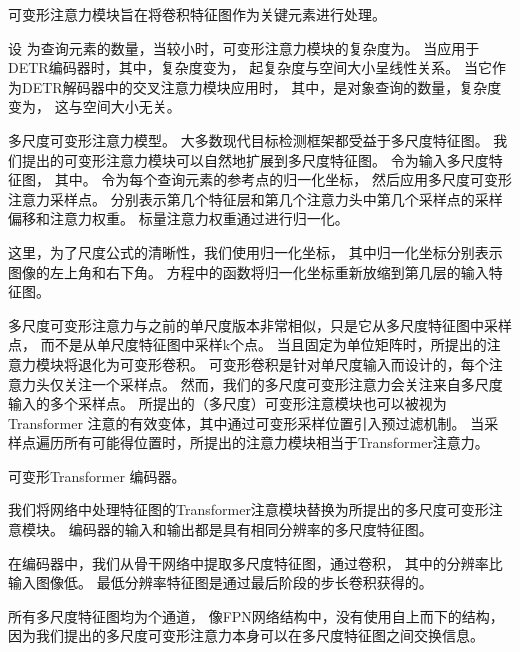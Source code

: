 可变形注意力模块旨在将卷积特征图作为关键元素进行处理。

设 为查询元素的数量，当较小时，可变形注意力模块的复杂度为。
当应用于DETR编码器时，其中，复杂度变为，
起复杂度与空间大小呈线性关系。
当它作为DETR解码器中的交叉注意力模块应用时，
其中，是对象查询的数量，复杂度变为，
这与空间大小无关。


多尺度可变形注意力模型。
大多数现代目标检测框架都受益于多尺度特征图。
我们提出的可变形注意力模块可以自然地扩展到多尺度特征图。
令为输入多尺度特征图，
其中。
令为每个查询元素的参考点的归一化坐标，
然后应用多尺度可变形注意力采样点。
分别表示第几个特征层和第几个注意力头中第几个采样点的采样偏移和注意力权重。
标量注意力权重通过进行归一化。

这里，为了尺度公式的清晰性，我们使用归一化坐标，
其中归一化坐标分别表示图像的左上角和右下角。
方程中的函数将归一化坐标重新放缩到第几层的输入特征图。


多尺度可变形注意力与之前的单尺度版本非常相似，只是它从多尺度特征图中采样点，
而不是从单尺度特征图中采样k个点。
当且固定为单位矩阵时，所提出的注意力模块将退化为可变形卷积。
可变形卷积是针对单尺度输入而设计的，每个注意力头仅关注一个采样点。
然而，我们的多尺度可变形注意力会关注来自多尺度输入的多个采样点。
所提出的（多尺度）可变形注意模块也可以被视为
Transformer 注意的有效变体，其中通过可变形采样位置引入预过滤机制。
当采样点遍历所有可能得位置时，所提出的注意力模块相当于Transformer注意力。


可变形Transformer 编码器。

我们将网络中处理特征图的Transformer注意模块替换为所提出的多尺度可变形注意模块。
编码器的输入和输出都是具有相同分辨率的多尺度特征图。

在编码器中，我们从骨干网络中提取多尺度特征图，通过卷积，
其中的分辨率比输入图像低。
最低分辨率特征图是通过最后阶段的步长卷积获得的。

所有多尺度特征图均为个通道，
像FPN网络结构中，没有使用自上而下的结构，因为我们提出的多尺度可变形注意力本身可以在多尺度特征图之间交换信息。






